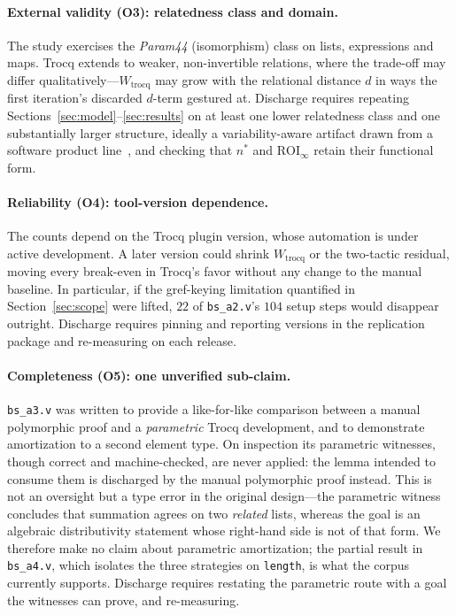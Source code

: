 \documentclass[runningheads]{llncs}
\begin{document}
\paragraph{External validity (O3): relatedness class and domain.}
The study exercises the \emph{Param44} (isomorphism) class on lists,
expressions and maps. Trocq extends to weaker, non-invertible relations,
where the trade-off may differ qualitatively---$W_{\text{trocq}}$ may grow
with the relational distance $d$ in ways the first iteration's discarded
$d$-term gestured at. Discharge requires repeating
Sections~\ref{sec:model}--\ref{sec:results} on at least one lower relatedness
class and one substantially larger structure, ideally a variability-aware
artifact drawn from a software product line~\cite{thum2014classification},
and checking that $n^{*}$ and $\mathrm{ROI}_{\infty}$ retain their functional
form.

\paragraph{Reliability (O4): tool-version dependence.} The counts depend on
the Trocq plugin version, whose automation is under active development. A
later version could shrink $W_{\text{trocq}}$ or the two-tactic residual,
moving every break-even in Trocq's favor without any change to the manual
baseline. In particular, if the gref-keying limitation quantified in
Section~\ref{sec:scope} were lifted, $22$ of \texttt{bs\_a2.v}'s $104$ setup
steps would disappear outright. Discharge requires pinning and reporting
versions in the replication package and re-measuring on each release.

\paragraph{Completeness (O5): one unverified sub-claim.}
\texttt{bs\_a3.v} was written to provide a like-for-like comparison between a
manual polymorphic proof and a \emph{parametric} Trocq development, and to
demonstrate amortization to a second element type. On inspection its
parametric witnesses, though correct and machine-checked, are never applied:
the lemma intended to consume them is discharged by the manual polymorphic
proof instead. This is not an oversight but a type error in the original
design---the parametric witness concludes that summation agrees on two
\emph{related} lists, whereas the goal is an algebraic distributivity
statement whose right-hand side is not of that form. We therefore make no
claim about parametric amortization; the partial result in \texttt{bs\_a4.v},
which isolates the three strategies on \texttt{length}, is what the corpus
currently supports. Discharge requires restating the parametric route with a
goal the witnesses can prove, and re-measuring.
\end{document}
